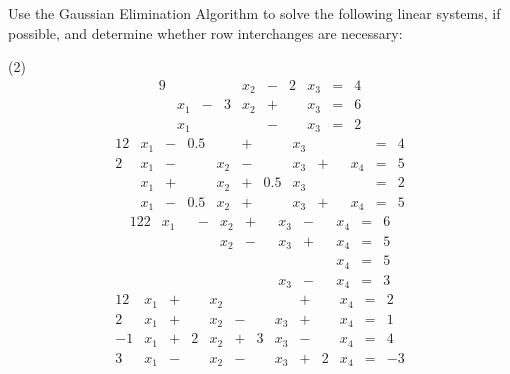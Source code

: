 \documentclass[../../../../Assignments]{subfiles}
\begin{document}
\begin{exercise}
    Use the Gaussian Elimination Algorithm to solve the following linear
    systems, if possible, and determine whether row interchanges are necessary:

    \begin{tasks}(2)
        \task
            \begin{alignat*}{9}
                &    &{} {}&  &x_2 &{}-{}& 2&x_3 &{}={}& 4 \\
                &x_1 &{}-{}& 3&x_2 &{}+{}&  &x_3 &{}={}& 6 \\
                &x_1 &{} {}&  &    &{}-{}&  &x_3 &{}={}& 2
            \end{alignat*}
        \task
           \begin{alignat*}{12}
                 &x_1 &{}-{}& \num{0.5}&    &{}+{}&          &x_3 &{} {}&  &    &{}={}& 4 \\
                2&x_1 &{}-{}&          &x_2 &{}-{}&          &x_3 &{}+{}&  &x_4 &{}={}& 5 \\
                 &x_1 &{}+{}&          &x_2 &{}+{}& \num{0.5}&x_3 &{} {}&  &    &{}={}& 2 \\
                 &x_1 &{}-{}& \num{0.5}&x_2 &{}+{}&          &x_3 &{}+{}&  &x_4 &{}={}& 5
            \end{alignat*}
        \task
            \begin{alignat*}{12}
                2&x_1 &{} {}& -{}&x_2 &{}+{}&  &x_3 &{}-{}&  &x_4 &{}={}& 6 \\
                 &    &{} {}&    &x_2 &{}-{}&  &x_3 &{}+{}&  &x_4 &{}={}& 5 \\
                 &    &{} {}&    &    &{} {}&  &    &{} {}&  &x_4 &{}={}& 5 \\
                 &    &{} {}&    &    &{} {}&  &x_3 &{}-{}&  &x_4 &{}={}& 3
            \end{alignat*}
        \task
            \begin{alignat*}{12}
                  &x_1 &{}+{}&  &x_2 &{} {}&  &    &{}+{}&  &x_4 &{}={}&  2 \\
                 2&x_1 &{}+{}&  &x_2 &{}-{}&  &x_3 &{}+{}&  &x_4 &{}={}&  1 \\
                -1&x_1 &{}+{}& 2&x_2 &{}+{}& 3&x_3 &{}-{}&  &x_4 &{}={}&  4 \\
                 3&x_1 &{}-{}&  &x_2 &{}-{}&  &x_3 &{}+{}& 2&x_4 &{}={}& -3
            \end{alignat*}
    \end{tasks}
\end{exercise}
\end{document}
